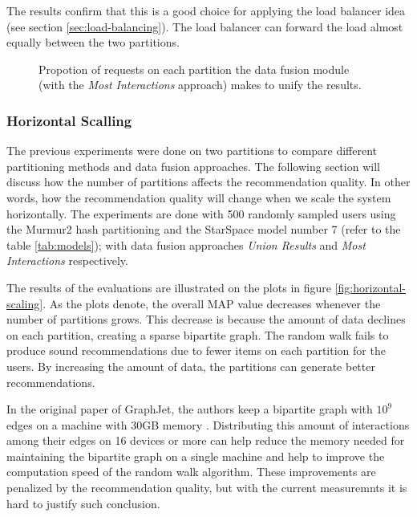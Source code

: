 The results confirm that this is a good choice for applying the load balancer idea (see section \ref{sec:load-balancing}). The load balancer can forward the load almost equally between the two partitions.

\begin{figure}[!htb]
    \centering
    
    \caption{Propotion of requests on each partition the data fusion module (with the \emph{Most Interactions} approach) makes to unify the results.}
    \label{plot:request-distribution}
\end{figure}


\subsubsection{Horizontal Scalling}
\label{subsubsec:eval-horizontal-scalling}
The previous experiments were done on two partitions to compare different partitioning methods and data fusion approaches. The following section will discuss how the number of partitions affects the recommendation quality. In other words, how the recommendation quality will change when we scale the system horizontally. The experiments are done with 500 randomly sampled users using the Murmur2 hash partitioning and the StarSpace model number 7 (refer to the table \ref{tab:models}); with data fusion approaches \emph{Union Results} and \emph{Most Interactions} respectively.


The results of the evaluations are illustrated on the plots in figure \ref{fig:horizontal-scaling}. As the plots denote, the overall MAP value decreases whenever the number of partitions grows. This decrease is because the amount of data declines on each partition, creating a sparse bipartite graph. The random walk fails to produce sound recommendations due to fewer items on each partition for the users. By increasing the amount of data, the partitions can generate better recommendations. 


In the original paper of GraphJet, the authors keep a bipartite graph with $10^9$ edges on a machine with 30GB memory \cite{sharmaGraphJetRealtimeContent2016}. Distributing this amount of interactions among their edges on 16 devices or more can help reduce the memory needed for maintaining the bipartite graph on a single machine and help to improve the computation speed of the random walk algorithm. These improvements are penalized by the recommendation quality, but with the current measuremnts it is hard to justify such conclusion.



